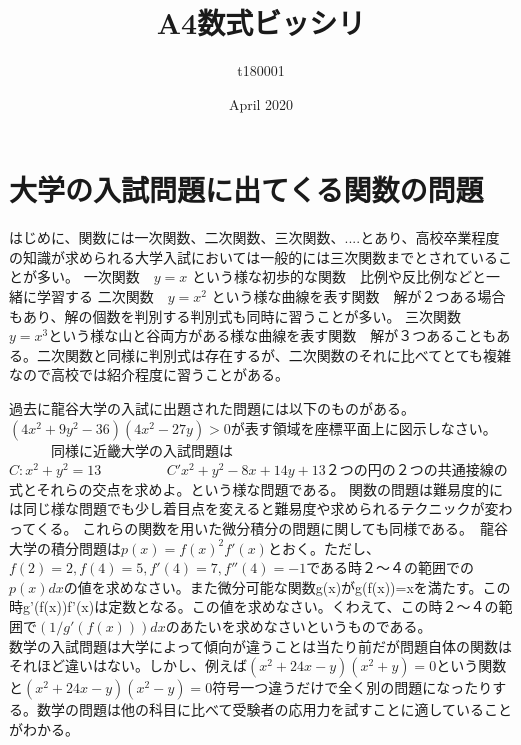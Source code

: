 \documentclass{article}
\title{A4数式ビッシリ}
\author{t180001 }
\date{April 2020}
\begin{document}
\maketitle

\section{大学の入試問題に出てくる関数の問題}
はじめに、関数には一次関数、二次関数、三次関数、....とあり、高校卒業程度の知識が求められる大学入試においては一般的には三次関数までとされていることが多い。
一次関数　$y=x$ という様な初歩的な関数　比例や反比例などと一緒に学習する
二次関数　$y=x^2$  という様な曲線を表す関数　解が２つある場合もあり、解の個数を判別する判別式も同時に習うことが多い。
三次関数　$y=x^3$という様な山と谷両方がある様な曲線を表す関数　解が３つあることもある。二次関数と同様に判別式は存在するが、二次関数のそれに比べてとても複雑なので高校では紹介程度に習うことがある。　

過去に龍谷大学の入試に出題された問題には以下のものがある。　　　　　$(4x^2+9y^2-36)(4x^2-27y)>0$が表す領域を座標平面上に図示しなさい。
　　　同様に近畿大学の入試問題は　　　　　　　　　　　　　　　　　　　　　　$C:x^2+y^2=13$   　　　　  $   C'x^2+y^2-8x+14y+13$２つの円の２つの共通接線の式とそれらの交点を求めよ。という様な問題である。
   関数の問題は難易度的には同じ様な問題でも少し着目点を変えると難易度や求められるテクニックが変わってくる。
   これらの関数を用いた微分積分の問題に関しても同様である。　龍谷大学の積分問題は$p(x)={f(x)}^2f'(x)$とおく。ただし、$f(2)=2,f(4)=5,f'(4)=7,f''(4)=-1$である時２〜４の範囲での$p(x)dx$の値を求めなさい。また微分可能な関数g(x)がg(f(x))=xを満たす。この時g'(f(x))f'(x)は定数となる。この値を求めなさい。くわえて、この時２〜４の範囲で$(1/g'(f(x)))dx$のあたいを求めなさいというものである。　　　　　　　　　　
数学の入試問題は大学によって傾向が違うことは当たり前だが問題自体の関数はそれほど違いはない。しかし、例えば$(x^2+24x-y)(x^2+y)=0$という関数と$(x^2+24x-y)(x^2-y)=0$符号一つ違うだけで全く別の問題になったりする。数学の問題は他の科目に比べて受験者の応用力を試すことに適していることがわかる。
\end{document}
